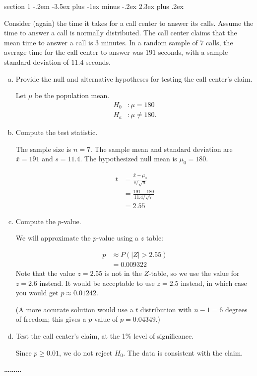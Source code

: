 \documentclass[answers,11pt]{exam}
\makeatletter
\newenvironment{problem}{\@startsection
       {section}
       {1}
       {-.2em}
       {-3.5ex plus -1ex minus -.2ex}
       {2.3ex plus .2ex}
       {\pagebreak[3]%
       \large\bf\noindent{Problem }
       }
       }
       {%
       \begin{center}\large\bf \ldots\ldots\ldots\end{center}}
\makeatother
\begin{document}
\begin{problem}{}

Consider (again) the time it takes for a call center to answer its calls. Assume the 
time to answer a call is normally distributed.  
The call center claims that the mean time to answer a call is $3$ minutes.  In a
random sample of $7$ calls, the average time for the call center to answer was
$191$ seconds, with a sample standard deviation of $11.4$ seconds.

\begin{enumerate}[(a)]


\item Provide the null and alternative hypotheses for testing the call
center's claim.
    \begin{solution}
Let $\mu$ be the population mean.
\begin{align*}
  H_0 &: \mu = 180 \\
  H_a &: \mu \neq 180.
\end{align*}


    \end{solution}
\item Compute the test statistic.
    \begin{solution}
The sample size is $n = 7$.  The sample mean and standard deviation are
$\bar x = 191$ and $s = 11.4$.  The hypothesized null mean is $\mu_0 = 180$.

\begin{align*}
  t &= \frac{\bar x - \mu_0}{s/\sqrt{n}} \\
    &= \frac{191 - 180}{11.4/\sqrt{7}} \\
    &= 2.55 
\end{align*}
    \end{solution}

\item Compute the $p$-value.
    \begin{solution}
We will approximate the $p$-value using a $z$ table:

\begin{align*}
  p &\approx P(|Z| > 2.55) \\
    &= 0.009322
\end{align*}
Note that the value $z = 2.55$ is not in the $Z$-table, so we use the value
for $z = 2.6$ instead.  It would be acceptable to use $z = 2.5$ instead, in
which case you would get $p \approx 0.01242$.

(A more accurate solution would use a $t$ distribution with $n - 1 = 6$
degrees of freedom; this gives a $p$-value of $p = 0.04349$.)

    \end{solution}

\item Test the call center's claim, at the 1\% level of significance.
    \begin{solution}
Since $p \geq 0.01$, we do not reject $H_0$.  The data is consistent with the
claim.

    \end{solution}

\end{enumerate}

\end{problem}
\end{document}
